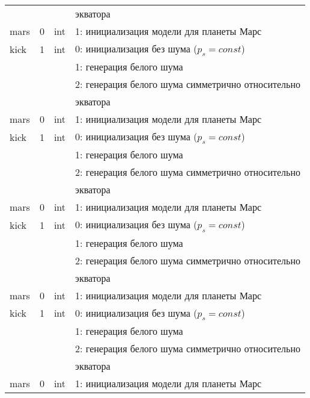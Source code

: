 \begin{longtable}[c]{|l|c|l|l|}
             &        &     & экватора                                          \\
    mars     & 0      & int & 1: инициализация модели для планеты Марс          \\
    kick     & 1      & int & 0: инициализация без шума (\(p_s = const\))       \\
             &        &     & 1: генерация белого шума                          \\
             &        &     & 2: генерация белого шума симметрично относительно \\
             &        &     & экватора                                          \\
    mars     & 0      & int & 1: инициализация модели для планеты Марс          \\
    kick     & 1      & int & 0: инициализация без шума (\(p_s = const\))       \\
             &        &     & 1: генерация белого шума                          \\
             &        &     & 2: генерация белого шума симметрично относительно \\
             &        &     & экватора                                          \\
    mars     & 0      & int & 1: инициализация модели для планеты Марс          \\
    kick     & 1      & int & 0: инициализация без шума (\(p_s = const\))       \\
             &        &     & 1: генерация белого шума                          \\
             &        &     & 2: генерация белого шума симметрично относительно \\
             &        &     & экватора                                          \\
    mars     & 0      & int & 1: инициализация модели для планеты Марс          \\
    kick     & 1      & int & 0: инициализация без шума (\(p_s = const\))       \\
             &        &     & 1: генерация белого шума                          \\
             &        &     & 2: генерация белого шума симметрично относительно \\
             &        &     & экватора                                          \\
    mars     & 0      & int & 1: инициализация модели для планеты Марс          \\

\end{longtable}
